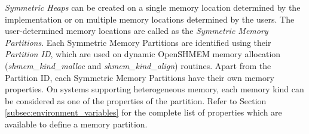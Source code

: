 \emph{Symmetric Heaps} can be created on a single memory location determined by
the implementation or on multiple memory locations determined by the users. The
user-determined memory locations are called as the \emph{Symmetric Memory
Partitions}. Each Symmetric Memory Partitions are identified using their
\emph{Partition ID}, which are used on dynamic OpenSHMEM memory allocation 
(\textit{shmem\_kind\_malloc} and \textit{shmem\_kind\_align}) routines. Apart
from the Partition ID, each Symmetric Memory Partitions have their own memory
properties. On systems supporting heterogeneous memory, each memory kind can be
considered as one of the properties of the partition. Refer to Section
\ref{subsec:environment_variables} for the complete list of properties which
are available to define a memory partition. 